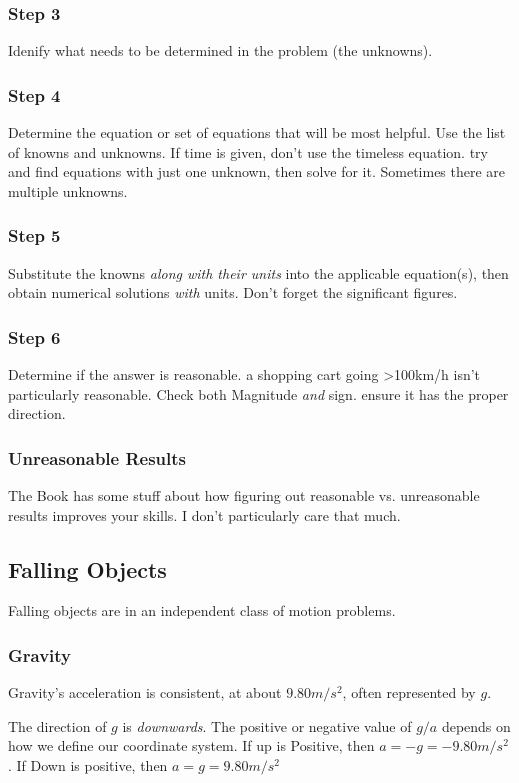 \documentclass{article}
\begin{document}
\subsubsection{Step 3}
Idenify what needs to be determined in the problem (the unknowns).
\subsubsection{Step 4}
Determine the equation or set of equations that will be most helpful. Use the list of knowns and unknowns. If time is given, don't use the timeless equation. try and find equations with just one unknown, then solve for it. Sometimes there are multiple unknowns.
\subsubsection{Step 5}
Substitute the knowns \emph{along with their units} into the applicable equation(s), then obtain numerical solutions \emph{with} units. Don't forget the significant figures.
\subsubsection{Step 6}
Determine if the answer is reasonable. a shopping cart going >100km/h isn't particularly reasonable. Check both Magnitude \emph{and} sign. ensure it has the proper direction.

\subsubsection{Unreasonable Results}
The Book has some stuff about how figuring out reasonable vs. unreasonable results improves your skills. I don't particularly care that much.




\subsection{Falling Objects}

Falling objects are in an independent class of motion problems.

\subsubsection{Gravity}
Gravity's acceleration is consistent, at about $9.80 m/s^2$, often represented by $g$.

The direction of $g$ is \emph{downwards}. The positive or negative value of $g/a$ depends on how we define our coordinate system. If up is Positive, then $a=-g=-9.80m/s^2$. If Down is positive, then $a=g=9.80m/s^2$
\end{document}
